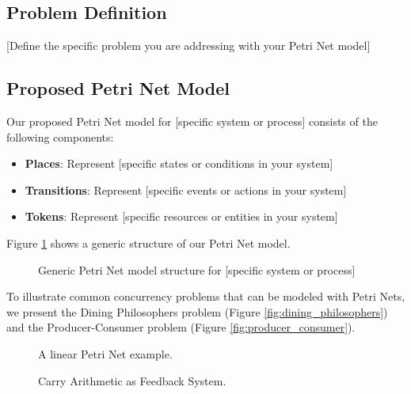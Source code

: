 \subsection{Problem Definition}

[Define the specific problem you are addressing with your Petri Net model]

\subsection{Proposed Petri Net Model}

Our proposed Petri Net model for [specific system or process] consists of the following components:

\begin{itemize}
    \item \textbf{Places}: Represent [specific states or conditions in your system]
    \item \textbf{Transitions}: Represent [specific events or actions in your system]
    \item \textbf{Tokens}: Represent [specific resources or entities in your system]
\end{itemize}

Figure \ref{fig:petri_net_generic_model} shows a generic structure of our Petri Net model.
\begin{figure}[htbp]
\centering

\caption{Generic Petri Net model structure for [specific system or process]}
\label{fig:petri_net_generic_model} %
\end{figure}

To illustrate common concurrency problems that can be modeled with Petri Nets, we present the Dining Philosophers problem (Figure \ref{fig:dining_philosophers}) and the Producer-Consumer problem (Figure \ref{fig:producer_consumer}).

\begin{figure*}[htbp]
\centering

\caption{Petri Net model of the Dining Philosophers problem}
\label{fig:dining_philosophers}
\end{figure*}

\begin{figure}[htbp]
\centering

\caption{A linear Petri Net example.}
\label{fig:linear_petri_net}
\end{figure}

\begin{figure}[htbp]
\centering

\caption{Carry Arithmetic as Feedback System.}
\label{fig:carry_arithmetic_feedback}
\end{figure}

